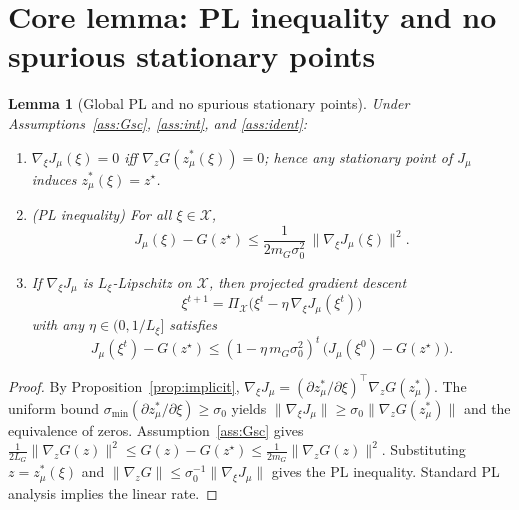 \documentclass[11pt]{article}
\newtheorem{lemma}{Lemma}
\theoremstyle{remark}
\begin{document}
\section{Core lemma: PL inequality and no spurious stationary points}
\begin{lemma}[Global PL and no spurious stationary points]
\label{lem:PL}
Under Assumptions~\ref{ass:Gsc}, \ref{ass:int}, and \ref{ass:ident}:
\begin{enumerate}[leftmargin=2em,label=(\alph*)]
\item $\nabla_\xi J_\mu(\xi)=0$ iff $\nabla_z G(z^*_\mu(\xi))=0$; hence any stationary point of $J_\mu$ induces $z^*_\mu(\xi)=z^\star$.
\item (PL inequality) For all $\xi\in\mathcal X$,
\begin{equation*}
J_\mu(\xi)-G(z^\star)\le \frac{1}{2 m_G \sigma_0^2}\,\|\nabla_\xi J_\mu(\xi)\|^2.
\end{equation*}
\item If $\nabla_\xi J_\mu$ is $L_\xi$-Lipschitz on $\mathcal X$, then projected gradient descent
\begin{equation*}
\xi^{t+1}=\Pi_{\mathcal X}\big(\xi^t-\eta\,\nabla_\xi J_\mu(\xi^t)\big)
\end{equation*}
with any $\eta\in(0,1/L_\xi]$ satisfies
\begin{equation*}
J_\mu(\xi^{t})-G(z^\star) \le (1-\eta\,m_G\sigma_0^2)^t\,\big(J_\mu(\xi^{0})-G(z^\star)\big).
\end{equation*}
\end{enumerate}
\end{lemma}
\begin{proof}
By Proposition~\ref{prop:implicit}, $\nabla_\xi J_\mu=(\partial z^*_\mu/\partial \xi)^\top \nabla_z G(z^*_\mu)$. The uniform bound $\sigma_{\min}(\partial z^*_\mu/\partial \xi)\ge \sigma_0$ yields 
$\|\nabla_\xi J_\mu\|\ge \sigma_0\|\nabla_z G(z^*_\mu)\|$ and the equivalence of zeros.
Assumption~\ref{ass:Gsc} gives $\frac{1}{2L_G}\|\nabla_z G(z)\|^2 \le G(z)-G(z^\star) \le \frac{1}{2m_G}\|\nabla_z G(z)\|^2$. Substituting $z=z^*_\mu(\xi)$ and $\|\nabla_z G\|\le \sigma_0^{-1}\|\nabla_\xi J_\mu\|$ gives the PL inequality. Standard PL analysis implies the linear rate.
\end{proof}
\end{document}
